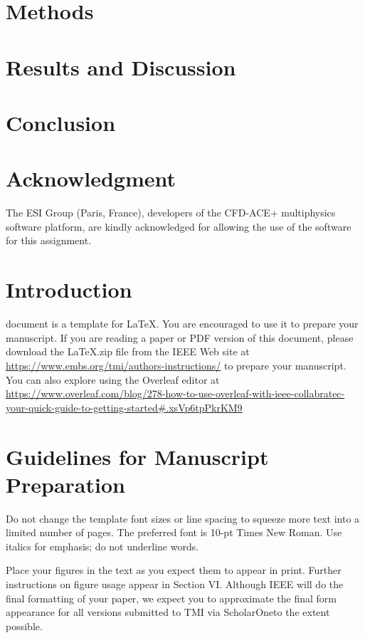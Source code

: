 \documentclass[journal,twoside,web]{ieeecolor}
\begin{document}
\section{Methods}
\section{Results and Discussion}
\section{Conclusion}
\section*{Acknowledgment}
The ESI Group (Paris, France), developers of the CFD-ACE+ multiphysics software platform, are kindly acknowledged for allowing the use of the software for this assignment.

\section{Introduction}
\label{sec:introduction}
 document is a template for \LaTeX.
You are encouraged to use it to prepare your manuscript.
If you are reading a paper or PDF version of this document, please download the
\LaTeX .zip file from the IEEE Web site at \underline
{https://www.embs.org/tmi/authors-instructions/} to prepare your manuscript.
You can also explore using the Overleaf editor at
\underline
{https://www.overleaf.com/blog/278-how-to-use-overleaf-with-}\discretionary{}{}{}\underline
{ieee-collabratec-your-quick-guide-to-getting-started\#.}\discretionary{}{}{}\underline{xsVp6tpPkrKM9}

\section{Guidelines for Manuscript Preparation}
Do not change the template font sizes or line spacing to squeeze more text into a limited number of pages.
The preferred font is 10-pt Times New Roman. Use italics for emphasis; do not underline words.

Place your figures in the text as you expect them to appear in print. Further instructions
on figure usage appear in Section VI. Although IEEE will do the final formatting of your paper,
we expect you to approximate the final form appearance for all versions
submitted to TMI via ScholarOne\textregistered to the extent possible.
\end{document}
